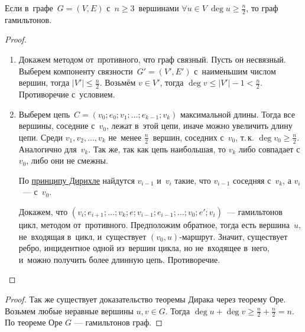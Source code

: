 \begin{theorem}[Дирака]
\label{th:Dirac}
Если в~графе~$G = (V, E)$ с~$n \geqslant 3$~вершинами $\forall u \in V \ \deg u \geqslant \frac{n}2$, то граф гамильтонов.
\end{theorem}
\begin{proof}
\begin{enumerate}
	\item Докажем методом от~противного, что граф связный.
	Пусть он несвязный.
	Выберем компоненту связности~$G' = (V', E')$ с~наименьшим числом вершин, тогда $|V'| \leqslant \frac{n}2$.
	Возьмём $v \in V'$, тогда $\deg v \leqslant |V'| - 1 < \frac{n}2$.
	Противоречие с~условием.
	\item Выберем цепь~$C = (v_0; e_0; v_1; \ldots; e_{k-1}; v_k)$ максимальной длины.
	Тогда все вершины, соседние с~$v_0$, лежат в~этой цепи, иначе можно увеличить длину цепи.
	Среди $v_1, v_2, \ldots, v_k$ не~менее $\frac{n}2$~вершин, соседних с~$v_0$, т.\,к. $\deg v_0 \geqslant \frac{n}2$.
	Аналогично для~$v_k$.
	Так же, так как цепь наибольшая, то $v_k$ либо совпадает с $v_0$, либо они не смежны.
	
	По \hyperlink{pigeonhole_principle}{принципу Дирихле} найдутся $v_{i-1}$ и~$v_i$ такие, что $v_{i-1}$ соседняя с~$v_k$, а $v_i$~--- с~$v_0$.
	
	Докажем, что $(v_i; e_{i+1}; \ldots; v_k; e; v_{i-1}; e_{i-1}; \ldots; v_0; e'; v_i)$~--- гамильтонов цикл, методом от~противного.
	Предположим обратное, тогда есть вершина~$u$, не~входящая в~цикл, и~существует $(v_0, u)$\nobreakdash-\hspace{0pt}маршрут.
	Значит, существует ребро, инцидентное одной из~вершин цикла, но не~входящее в~него, и~можно получить более длинную цепь.
	Противоречие.
\end{enumerate}
\end{proof}
\begin{proof}
Так же существует доказательство теоремы Дирака через теорему Оре.
Возьмем любые неравные вершины $u, v \in G$. Тогда $\deg u + \deg v \geqslant \frac n 2 + \frac n 2 = n$. По теореме Оре $G$ — гамильтонов граф.
\end{proof}

